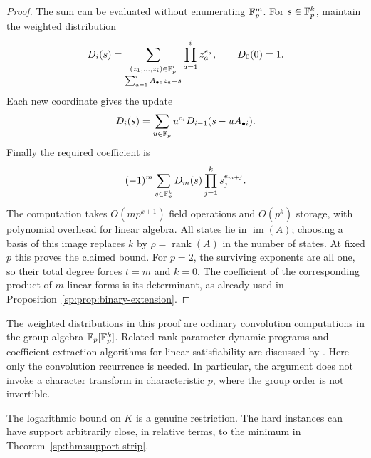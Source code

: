 \begin{proof}
The sum can be evaluated without enumerating $\mathbb F_p^m$.
For $s\in\mathbb F_p^k$, maintain the weighted distribution
\[
 D_i(s)=
 \sum_{\substack{(z_1,\ldots,z_i)\in\mathbb F_p^i\\
                  \sum_{a=1}^i A_{\bullet a}z_a=s}}
       \prod_{a=1}^i z_a^{e_a},
 \qquad D_0(0)=1.
\]
Each new coordinate gives the update
\[
 D_i(s)=\sum_{u\in\mathbb F_p}u^{e_i}
           D_{i-1}(s-uA_{\bullet i}).
\]
Finally the required coefficient is
\[
 (-1)^m\sum_{s\in\mathbb F_p^k}D_m(s)
                    \prod_{j=1}^k s_j^{e_{m+j}}.
\]
The computation takes $O(mp^{k+1})$ field operations and $O(p^k)$
storage, with polynomial overhead for linear algebra. All states lie
in $\operatorname{im}(A)$; choosing a basis of this image replaces
$k$ by $\rho=\operatorname{rank}(A)$ in the number of states.
At fixed $p$ this proves the claimed bound. For $p=2$, the surviving
exponents are all one, so their total degree forces $t=m$ and $k=0$.
The coefficient of the corresponding product of $m$ linear forms
is its determinant, as already used in
Proposition~\ref{sp:prop:binary-extension}.
\end{proof}

The weighted distributions in this proof are ordinary convolution
computations in the group algebra $\mathbb F_p[\mathbb F_p^k]$. Related rank-parameter
dynamic programs and coefficient-extraction algorithms for linear
satisfiability are discussed by \citet[Section~4; see also the discussion
before Theorem~2]{sp-kkn}. Here only the convolution recurrence is
needed. In particular, the argument does not invoke a character
transform in characteristic $p$, where the group order is not
invertible.

The logarithmic bound on $K$ is a genuine restriction. The hard
instances can have support arbitrarily close, in relative terms, to
the minimum in Theorem~\ref{sp:thm:support-strip}.

